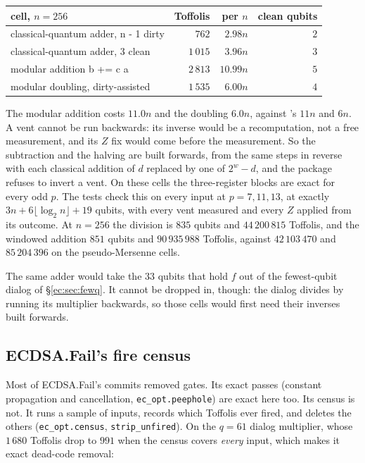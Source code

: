 \documentclass[11pt]{article}
\theoremstyle{plain}
\theoremstyle{remark}
\begin{document}
\begin{center}\small
\begin{tabular}{lrrr}
\toprule
cell, $n=256$ & Toffolis & per $n$ & clean qubits\\
\midrule
classical-quantum adder, n - 1 dirty & $762$ & $2.98n$ & $2$\\
classical-quantum adder, 3 clean & $1\,015$ & $3.96n$ & $3$\\
modular addition b += c a & $2\,813$ & $10.99n$ & $5$\\
modular doubling, dirty-assisted & $1\,535$ & $6.00n$ & $4$\\
\bottomrule
\end{tabular}
\end{center}

\noindent The modular addition costs $11.0n$ and the doubling $6.0n$, against
\cite{ec:luo26}'s $11n$ and $6n$. A vent cannot be run backwards: its inverse would be a
recomputation, not a free measurement, and its $Z$ fix would come before the measurement. So the
subtraction and the halving are built forwards, from the same steps in reverse with each classical
addition of $d$ replaced by one of $2^w-d$, and the package refuses to invert a vent. On these cells
the three-register blocks are exact for every odd $p$. The tests check this on every input at
$p=7,11,13$, at exactly $3n+6\lfloor\log_2n\rfloor+19$ qubits, with every vent measured and every $Z$
applied from its outcome. At $n=256$ the division is $835$ qubits and $44\,200\,815$
Toffolis, and the windowed addition $851$ qubits and $90\,935\,988$ Toffolis, against
$42\,103\,470$ and $85\,204\,396$ on the pseudo-Mersenne cells.

The same adder would take the $33$ qubits that hold $f$ out of the fewest-qubit dialog of
\S\ref{ec:sec:fewq}. It cannot be dropped in, though: the dialog divides by running its
multiplier backwards, so those cells would first need their inverses built forwards.

\subsection{ECDSA.Fail's fire census}

Most of ECDSA.Fail's commits removed gates. Its exact passes (constant propagation and
cancellation, \texttt{ec\_opt.peephole}) are exact here too. Its census is not. It runs a sample of
inputs, records which Toffolis ever fired, and deletes the others (\texttt{ec\_opt.census},
\texttt{strip\_unfired}). On the $q=61$ dialog multiplier, whose $1\,680$ Toffolis drop to
$991$ when the census covers \emph{every} input, which makes it exact dead-code removal:
\end{document}
